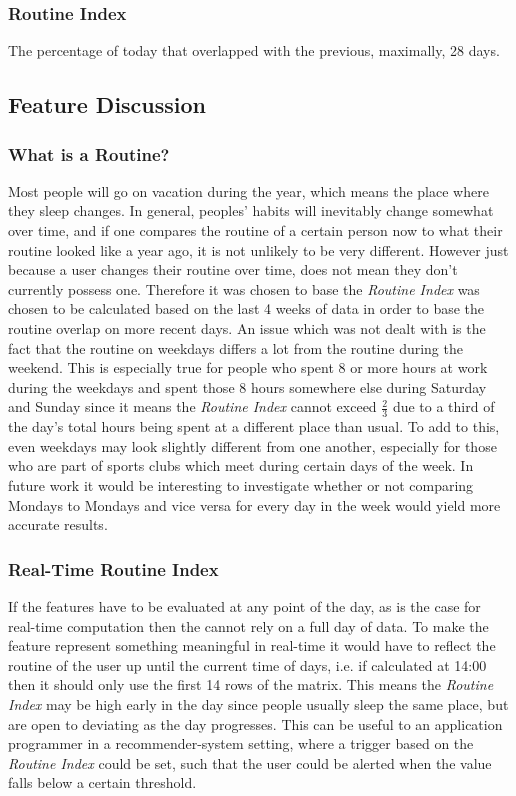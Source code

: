 \subsubsection*{Routine Index}
The percentage of today that overlapped with the previous, maximally, 28 days.

\subsection{Feature Discussion}
\subsubsection*{What is a Routine?}
Most people will go on vacation during the year, which means the place where they sleep changes. In general, peoples' habits will inevitably change somewhat over time, and if one compares the routine of a certain person now to what their routine looked like a year ago, it is not unlikely to be very different. However just because a user changes their routine over time, does not mean they don't currently possess one. Therefore it was chosen to base the \textit{Routine Index} was chosen to be calculated based on the last 4 weeks of data in order to base the routine overlap on more recent days. An issue which was not dealt with is the fact that the routine on weekdays differs a lot from the routine during the weekend. This is especially true for people who spent 8 or more hours at work during the weekdays and spent those 8 hours somewhere else during Saturday and Sunday since it means the \textit{Routine Index} cannot exceed $\frac{2}{3}$ due to a third of the day's total hours being spent at a different place than usual. To add to this, even weekdays may look slightly different from one another, especially for those who are part of sports clubs which meet during certain days of the week. In future work it would be interesting to investigate whether or not comparing Mondays to Mondays and vice versa for every day in the week would yield more accurate results.

\subsubsection*{Real-Time Routine Index}
If the features have to be evaluated at any point of the day, as is the case for real-time computation then the  cannot rely on a full day of data. To make the feature represent something meaningful in real-time it would have to reflect the routine of the user up until the current time of days, i.e. if calculated at 14:00 then it should only use the first 14 rows of the matrix. This means the \textit{Routine Index} may be high early in the day since people usually sleep the same place, but are open to deviating as the day progresses. This can be useful to an application programmer in a recommender-system setting, where a trigger based on the \textit{Routine Index} could be set, such that the user could be alerted when the value falls below a certain threshold.

